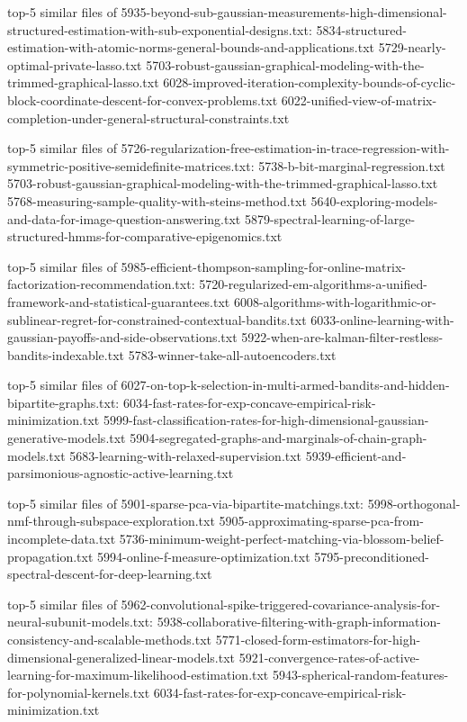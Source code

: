 \documentclass[11pt]{article}
\begin{document}
top-5 similar files of
5935-beyond-sub-gaussian-measurements-high-dimensional-structured-estimation-with-sub-exponential-designs.txt:
5834-structured-estimation-with-atomic-norms-general-bounds-and-applications.txt
5729-nearly-optimal-private-lasso.txt
5703-robust-gaussian-graphical-modeling-with-the-trimmed-graphical-lasso.txt
6028-improved-iteration-complexity-bounds-of-cyclic-block-coordinate-descent-for-convex-problems.txt
6022-unified-view-of-matrix-completion-under-general-structural-constraints.txt

top-5 similar files of
5726-regularization-free-estimation-in-trace-regression-with-symmetric-positive-semidefinite-matrices.txt:
5738-b-bit-marginal-regression.txt
5703-robust-gaussian-graphical-modeling-with-the-trimmed-graphical-lasso.txt
5768-measuring-sample-quality-with-steins-method.txt
5640-exploring-models-and-data-for-image-question-answering.txt
5879-spectral-learning-of-large-structured-hmms-for-comparative-epigenomics.txt

top-5 similar files of
5985-efficient-thompson-sampling-for-online-matrix-factorization-recommendation.txt:
5720-regularized-em-algorithms-a-unified-framework-and-statistical-guarantees.txt
6008-algorithms-with-logarithmic-or-sublinear-regret-for-constrained-contextual-bandits.txt
6033-online-learning-with-gaussian-payoffs-and-side-observations.txt
5922-when-are-kalman-filter-restless-bandits-indexable.txt
5783-winner-take-all-autoencoders.txt

top-5 similar files of
6027-on-top-k-selection-in-multi-armed-bandits-and-hidden-bipartite-graphs.txt:
6034-fast-rates-for-exp-concave-empirical-risk-minimization.txt
5999-fast-classification-rates-for-high-dimensional-gaussian-generative-models.txt
5904-segregated-graphs-and-marginals-of-chain-graph-models.txt
5683-learning-with-relaxed-supervision.txt
5939-efficient-and-parsimonious-agnostic-active-learning.txt

top-5 similar files of 5901-sparse-pca-via-bipartite-matchings.txt:
5998-orthogonal-nmf-through-subspace-exploration.txt
5905-approximating-sparse-pca-from-incomplete-data.txt
5736-minimum-weight-perfect-matching-via-blossom-belief-propagation.txt
5994-online-f-measure-optimization.txt
5795-preconditioned-spectral-descent-for-deep-learning.txt

top-5 similar files of
5962-convolutional-spike-triggered-covariance-analysis-for-neural-subunit-models.txt:
5938-collaborative-filtering-with-graph-information-consistency-and-scalable-methods.txt
5771-closed-form-estimators-for-high-dimensional-generalized-linear-models.txt
5921-convergence-rates-of-active-learning-for-maximum-likelihood-estimation.txt
5943-spherical-random-features-for-polynomial-kernels.txt
6034-fast-rates-for-exp-concave-empirical-risk-minimization.txt
\end{document}
